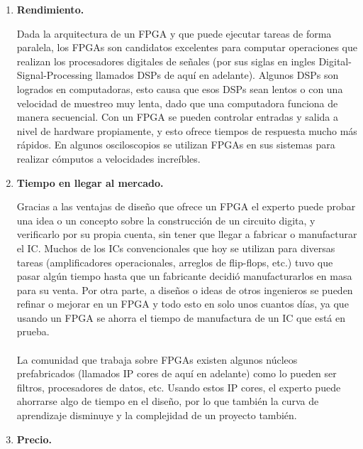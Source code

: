 \documentclass[twoside,spanish,ESP,MSc]{plantillaLabUPV}
\theoremstyle{definition}
\newcommand{\f}{FPGA }
\newcommand{\fs}{FPGAs }
\begin{document}
\begin{enumerate}
\item \textbf{Rendimiento.}


Dada la arquitectura de un \f y que puede ejecutar tareas de forma paralela, los \fs son candidatos excelentes para computar operaciones que realizan los procesadores digitales de señales (por sus siglas en ingles Digital-Signal-Processing llamados DSPs de aquí en adelante). Algunos DSPs son logrados en computadoras, esto causa que esos DSPs sean lentos o con una velocidad de muestreo muy lenta, dado que una computadora funciona de manera secuencial. Con un \f se pueden controlar entradas y salida a nivel de hardware propiamente, y esto ofrece tiempos de respuesta mucho más rápidos. En algunos osciloscopios se utilizan \fs en sus sistemas para realizar cómputos a velocidades increíbles.\\

\item \textbf{Tiempo en llegar al mercado.}

Gracias a las ventajas de diseño que ofrece un \f el experto puede probar una idea o un concepto sobre la construcción de un circuito digita, y verificarlo por su propia cuenta, sin tener que llegar a fabricar o manufacturar el IC. Muchos de los ICs convencionales que hoy se utilizan para diversas tareas (amplificadores operacionales, arreglos de flip-flops, etc.) tuvo que pasar algún tiempo hasta que un fabricante decidió manufacturarlos en masa para su venta. Por otra parte, a diseños o ideas de otros ingenieros se pueden refinar o mejorar en un FPGA y todo esto en solo unos cuantos días, ya que usando un \f se ahorra el tiempo de manufactura de un IC que está en prueba.\\\\
La comunidad que trabaja sobre \fs existen algunos núcleos prefabricados (llamados IP cores de aquí en adelante) como lo pueden ser filtros, procesadores de datos, etc. Usando estos IP cores, el experto puede ahorrarse algo de tiempo en el diseño, por lo que también la curva de aprendizaje disminuye y la complejidad de un proyecto también.\\


\item \textbf{Precio.}


\end{enumerate}
\end{document}
